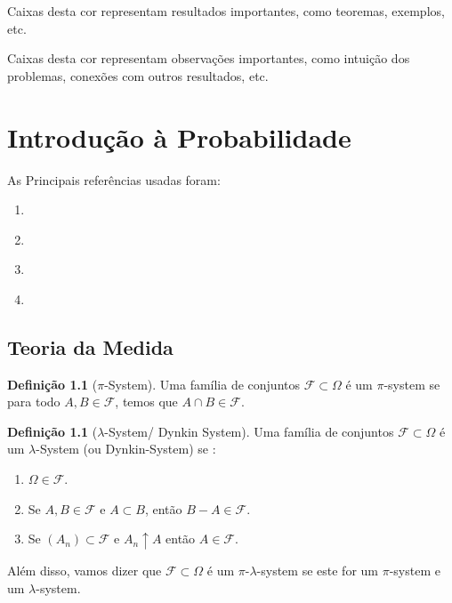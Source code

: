 \documentclass[12pt,a4paper,oneside]{book}
\theoremstyle{definition}
\newtheorem{definition}[theorem]{Defini\c{c}\~ao}
\theoremstyle{remark}
\numberwithin{equation}{section}
\begin{document}
\begin{tcolorbox}
Caixas desta cor representam resultados importantes, como teoremas, exemplos, etc.
\end{tcolorbox}

\begin{tcolorbox}[colback = yellow!70]
Caixas desta cor representam observações importantes, como intuição dos problemas, conexões com outros resultados, etc.
\end{tcolorbox}



\chapter{Introdução à Probabilidade  }

\begin{tcolorbox}[colback = white]
As Principais referências usadas foram:
\begin{enumerate}
\item \cite{durrett}
\item \cite{spencer-probMethod}
\item \cite{knill}
\item \cite{stoyanov2014counterexamples}
\end{enumerate}

\end{tcolorbox}

\section{Teoria da Medida}


\begin{definition}[$\pi$-System]  Uma família de conjuntos $\mathcal{F}\subset \Omega$ é um $\pi$-system se para todo $A,B\in \mathcal{F}$, temos que $A\cap B\in \mathcal{F}.$

\end{definition}





\begin{definition}[$\lambda$-System/ Dynkin System]   Uma família de conjuntos $\mathcal{F}\subset \Omega$ é um $\lambda$-System  (ou Dynkin-System) se :
\begin{enumerate}
\item $\Omega\in \mathcal{F}$.
\item Se $A,B\in \mathcal{F}$ e $A\subset B$, então $B-A\in \mathcal{F}.$
\item Se $(A_n)\subset \mathcal{F}$ e  $A_n\uparrow A$ então $A\in \mathcal{F}.$
\end{enumerate}

Além disso, vamos dizer que $\mathcal{F}\subset \Omega$ é um $\pi$-$\lambda$-system se este for um $\pi$-system e um $\lambda$-system.
\end{definition}
\end{document}
